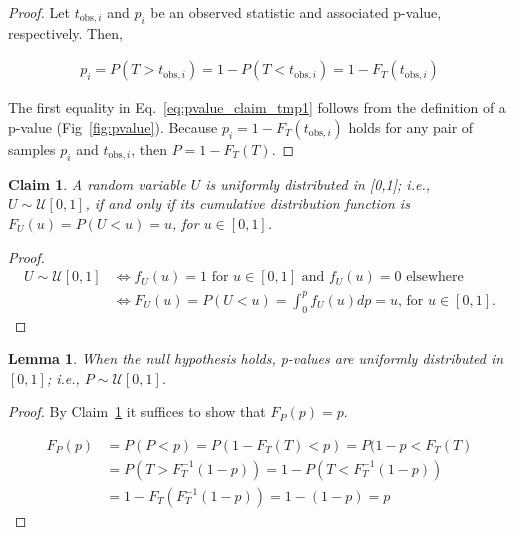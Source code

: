 \documentclass[12pt]{article}
\newtheorem{claim}{Claim}
\newtheorem{lemma}{Lemma}
\begin{document}
\begin{appendices}
\begin{proof}
    Let $t_{\text{obs},i}$ and $p_i$ be an observed statistic and associated
    p-value, respectively. Then,

    \begin{align}
        p_i=P(T>t_{\text{obs},i})=1-P(T<t_{\text{obs},i})=1-F_T(t_{\text{obs},i})\label{eq:pvalue_claim_tmp1}
    \end{align}

    The first equality in Eq.~\ref{eq:pvalue_claim_tmp1} follows from the
    definition of a p-value (Fig~\ref{fig:pvalue}). Because
    $p_i=1-F_T(t_{\text{obs},i})$ holds for any pair of samples $p_i$
    and $t_{\text{obs},i}$, then $P=1-F_T(T)$.
\end{proof}

\begin{claim}

    A random variable $U$ is uniformly distributed in [0,1]; i.e.,
    $U\sim\mathcal{U}[0,1]$, if and only if its cumulative distribution
    function is $F_U(u)=P(U<u)=u$, for $u\in[0,1]$.
    \label{claim:uniform_cummulative}

\end{claim}

\begin{proof}

    \begin{align}
        U\sim\mathcal{U}[0,1] &\iff f_U(u)=1 \text{ for } u\in[0,1] \text{ and } f_U(u)=0 \text{ elsewhere } \\
                              &\iff F_U(u)=P(U<u)=\int_0^pf_U(u)dp=u\text{, for }u\in[0,1].
    \end{align}

\end{proof}

\begin{lemma}

    When the null hypothesis holds, p-values are uniformly distributed in
    $[0,1]$; i.e., $P\sim\mathcal{U}[0,1]$.
    \label{lemma:p_values_uniform01}
\end{lemma}

\begin{proof}
    By Claim~\ref{claim:uniform_cummulative} it suffices to show that $F_P(p)=p$.

    \begin{align}
        F_P(p)&=P(P<p)=P(1-F_T(T)<p)=P(1-p<F_T(T)\label{eq:lemmaUniformPvaluesLine1}\\
              &=P(T>F_T^{-1}(1-p))=1-P(T<F_T^{-1}(1-p))\nonumber\\
              &=1-F_T(F_T^{-1}(1-p))=1-(1-p)=p\nonumber
    \end{align}


\end{proof}
\end{appendices}
\end{document}
